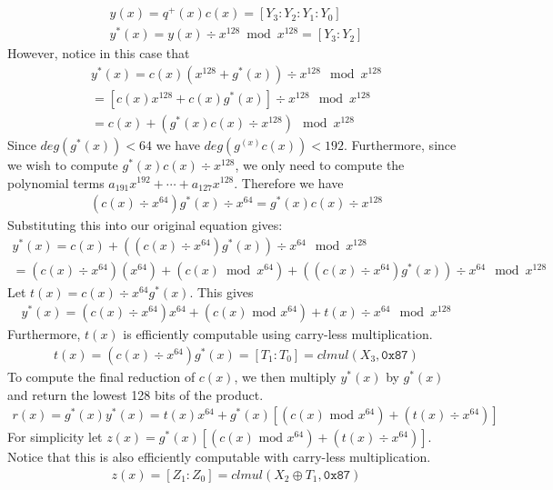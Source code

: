 \documentclass[hctr.tex]{subfiles}
\begin{document}
\begin{gather*}
       y(x) = q^+(x)c(x) = [Y_3 : Y_2 : Y_1 : Y_0]\\
       y^*(x) = y(x) \div x^{128} \bmod x^{128} = [Y_3 : Y_2]
\end{gather*}
However, notice in this case that
\begin{gather*}
       y^*(x) = c(x)(x^{128} + g^*(x)) \div x^{128} \mod x^{128}\\
       = [c(x)x^{128} + c(x)g^*(x)] \div x^{128} \mod x^{128}\\
       = c(x) + (g^*(x)c(x) \div x^{128}) \mod x^{128}
\end{gather*}
Since $deg(g^*(x)) < 64$ we have $deg(g^(x)c(x)) < 192$. Furthermore, since we wish to compute $g^*(x)c(x) \div x^{128}$, we only need to compute the polynomial terms $a_{191}x^{192} + \cdots + a_{127}x^{128}$. Therefore we have
\begin{align*}
       (c(x) \div x^{64})g^*(x) \div x^{64} = g^*(x)c(x) \div x^{128}
\end{align*}
Substituting this into our original equation gives:
\begin{gather*}
       y^*(x) = c(x) + ((c(x) \div x^{64})g^*(x)) \div x^{64} \mod x^{128}\\
       = (c(x) \div x^{64})(x^{64}) + (c(x) \bmod x^{64}) + ((c(x) \div x^{64})g^*(x)) \div x^{64} \mod x^{128}
\end{gather*}
Let $t(x) = c(x) \div x^{64}g^*(x)$. This gives
\begin{align*}
       y^*(x) = (c(x) \div x^{64})x^{64} + (c(x) \text{ mod } x^{64}) + t(x) \div x^{64} \mod x^{128}
\end{align*}
Furthermore, $t(x)$ is efficiently computable using carry-less multiplication.
\begin{align*}
       t(x) = (c(x) \div x^{64})g^*(x) = [T_1 : T_0] = clmul(X_3, \texttt{0x87})
\end{align*}
To compute the final reduction of $c(x)$, we then multiply $y^*(x)$ by $g^*(x)$ and return the lowest 128 bits of the product.
\begin{align*}
       r(x) = g^*(x)y^*(x) = t(x)x^{64} + g^*(x)\left[(c(x) \text{ mod } x^{64}) + (t(x) \div x^{64})\right]
\end{align*}
For simplicity let $z(x) = g^*(x)\left[(c(x) \text{ mod } x^{64}) + (t(x) \div x^{64})\right]$. Notice that this is also efficiently computable with carry-less multiplication.
\begin{align*}
       z(x) = [Z_1 : Z_0] = clmul(X_2 \oplus T_1,\texttt{0x87})
\end{align*}
\end{document}
